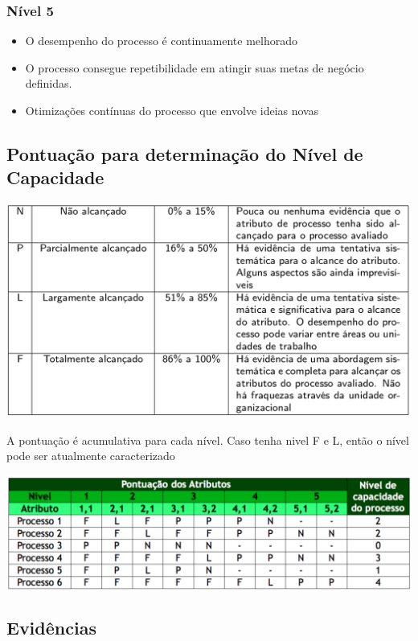 \documentclass{article}
\begin{document}
	\subsubsection{Nível 5}
		\begin{itemize}
		\item O desempenho do processo é continuamente melhorado
		\item O processo consegue repetibilidade em atingir suas metas de negócio definidas.	
		\item Otimizações contínuas do processo que envolve ideias novas
		
		\end{itemize}				
	
\subsection{Pontuação para determinação do Nível de Capacidade}

	\includegraphics[scale=0.35]{tabela_pontuacao}
	
	A pontuação é acumulativa para cada nível.
	Caso tenha nivel F e L, então o nível pode ser atualmente caracterizado
	
	\includegraphics[scale=0.37]{exemplo_pontuacao}
\subsection{Evidências}
\end{document}
